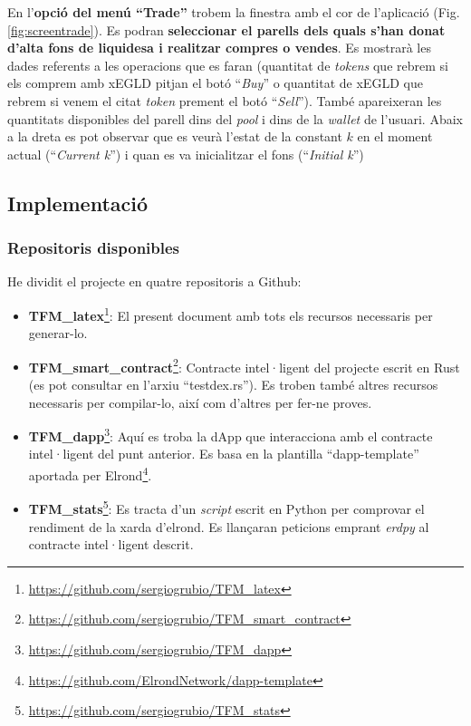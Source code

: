 \documentclass[11pt,a4paper]{article}
\begin{document}
En l'\textbf{opció del menú ``Trade''} trobem la finestra amb el cor de l'aplicació (Fig. \ref{fig:screentrade}). Es podran \textbf{seleccionar el parells dels quals s'han donat d'alta fons de liquidesa i realitzar compres o vendes}. Es mostrarà les dades referents a les operacions que es faran (quantitat de \textit{tokens} que rebrem si els comprem amb xEGLD pitjan el botó ``\textit{Buy}'' o quantitat de xEGLD que rebrem si venem el citat \textit{token} prement el botó ``\textit{Sell}''). També apareixeran les quantitats disponibles del parell dins del \textit{pool} i dins de la \textit{wallet} de l'usuari. Abaix a la dreta es pot observar que es veurà l'estat de la constant \(k\) en el moment actual (``\textit{Current k}'') i quan es va inicialitzar el fons (``\textit{Initial k}'')

\subsection{Implementació}\label{sec:imp}
\subsubsection{Repositoris disponibles}
He dividit el projecte en quatre repositoris a Github:
\begin{itemize}
\item \textbf{TFM\_latex}\footnote{\url{https://github.com/sergiogrubio/TFM_latex}}: El present document amb tots els recursos necessaris per generar-lo.
\item \textbf{TFM\_smart\_contract}\footnote{\url{https://github.com/sergiogrubio/TFM_smart_contract}}: Contracte intel·ligent del projecte escrit en Rust (es pot consultar en l'arxiu ``testdex.rs''). Es troben també altres recursos necessaris per compilar-lo, així com d'altres per fer-ne proves.
\item \textbf{TFM\_dapp}\footnote{\url{https://github.com/sergiogrubio/TFM_dapp}}: Aquí es troba la dApp que interacciona amb el contracte intel·ligent del punt anterior. Es basa en la plantilla ``dapp-template'' aportada per Elrond\footnote{\url{https://github.com/ElrondNetwork/dapp-template}}.
\item \textbf{TFM\_stats}\footnote{\url{https://github.com/sergiogrubio/TFM_stats}}: Es tracta d'un \textit{script} escrit en Python per comprovar el rendiment de la xarda d'elrond. Es llançaran peticions emprant \textit{erdpy} al contracte intel·ligent descrit.  
\end{itemize}
\end{document}
